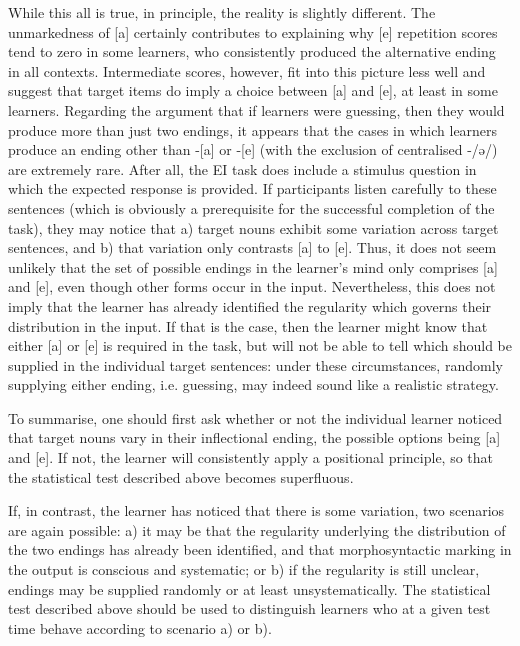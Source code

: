 While this all is true, in principle, the reality is slightly different. The unmarkedness of [a] certainly contributes to explaining why [e] repetition scores tend to zero in some learners, who consistently produced the alternative ending in all contexts. Intermediate scores, however, fit into this picture less well and suggest that target items do imply a choice between [a] and [e], at least in some learners. Regarding the argument that if learners were guessing, then they would produce more than just two endings, it appears that the cases in which learners produce an ending other than -[a] or -[e] (with the exclusion of centralised -/ə/) are extremely rare. After all, the EI task does include a stimulus question in which the expected response is provided. If participants listen carefully to these sentences (which is obviously a prerequisite for the successful completion of the task), they may notice that a) target nouns exhibit some variation across target sentences, and b) that variation only contrasts [a] to [e]. Thus, it does not seem unlikely that the set of possible endings in the learner’s mind only comprises [a] and [e], even though other forms occur in the input. Nevertheless, this does not imply that the learner has already identified the regularity which governs their distribution in the input. If that is the case, then the learner might know that either [a] or [e] is required in the task, but will not be able to tell which should be supplied in the individual target sentences: under these circumstances, randomly supplying either ending, i.e. guessing, may indeed sound like a realistic strategy.

To summarise, one should first ask whether or not the individual learner noticed that target nouns vary in their inflectional ending, the possible options being [a] and [e]. If not, the learner will consistently apply a positional principle, so that the statistical test described above becomes superfluous.

If, in contrast, the learner has noticed that there is some variation, two scenarios are again possible:  a) it may be that the regularity underlying the distribution of the two endings has already been identified, and that morphosyntactic marking in the output is conscious and systematic; or b) if the regularity is still unclear, endings may be supplied randomly or at least unsystematically. The statistical test described above should be used to distinguish learners who at a given test time behave according to scenario a) or b). 

